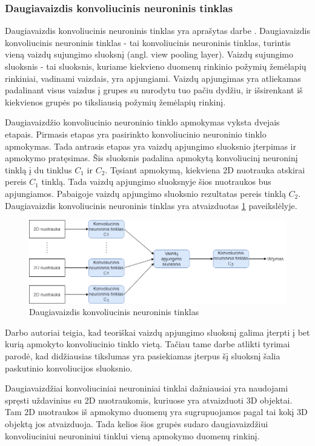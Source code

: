 \subsubsection{Daugiavaizdis konvoliucinis neuroninis tinklas}

Daugiavaizdis konvoliucinis neuroninis tinklas yra aprašytas darbe \cite{cnnExp1}. Daugiavaizdis konvoliucinis neuroninis tinklas - tai konvoliucinis neuroninis tinklas, turintis vieną vaizdų sujungimo sluoksnį (angl. view pooling layer). Vaizdų sujungimo sluoksnis - tai sluoksnis, kuriame kiekvieno duomenų rinkinio požymių žemėlapių rinkiniai, vadinami vaizdais, yra apjungiami. Vaizdų apjungimas yra atliekamas padalinant visus vaizdus į grupes su nurodytu tuo pačiu dydžiu, ir išsirenkant iš kiekvienos grupės po tiksliausią požymių žemėlapių rinkinį.

Daugiavaizdžio konvoliucinio neuroninio tinklo apmokymas vyksta dvejais etapais. Pirmasis etapas yra pasirinkto konvoliucinio neuroninio tinklo apmokymas. Tada antrasis etapas yra vaizdų apjungimo sluoksnio įterpimas ir apmokymo pratęsimas. Šis sluoksnis padalina apmokytą konvoliucinį neuroninį tinklą į du tinklus $C_1$ ir $C_2$. Tęsiant apmokymą, kiekviena 2D nuotrauka atskirai pereis $C_1$ tinklą. Tada vaizdų apjungimo sluoksnyje šios nuotraukos bus apjungiamos. Pabaigoje vaizdų apjungimo sluoksnio rezultatas pereis tinklą $C_2$. Daugiavaizdis konvoliucinis neuroninis tinklas yra atvaizduotas \ref{img:mvcnn} paveikslėlyje.

\begin{figure}[H]
	\centering
	\includegraphics[scale=0.5]{img/mvcnn.png}
	\caption{Daugiavaizdis konvoliucinis neuroninis tinklas}
	\label{img:mvcnn}
\end{figure}

Darbo \cite{cnnExp1} autoriai teigia, kad teoriškai vaizdų apjungimo sluoksnį galima įterpti į bet kurią apmokyto konvoliucinio tinklo vietą. Tačiau tame darbe atlikti tyrimai parodė, kad didžiausias tikslumas yra pasiekiamas įterpus šį sluoksnį šalia paskutinio konvoliucijos sluoksnio.

Daugiavaizdžiai konvoliuciniai neuroniniai tinklai dažniausiai yra naudojami spręsti uždavinius su 2D nuotraukomis, kuriuose yra atvaizduoti 3D objektai. Tam 2D nuotraukos iš apmokymo duomenų yra sugrupuojamos pagal tai kokį 3D objektą jos atvaizduoja. Tada kelios šios grupės sudaro daugiavaizdžiui konvoliuciniui neuroniniui tinklui vieną apmokymo duomenų rinkinį.

